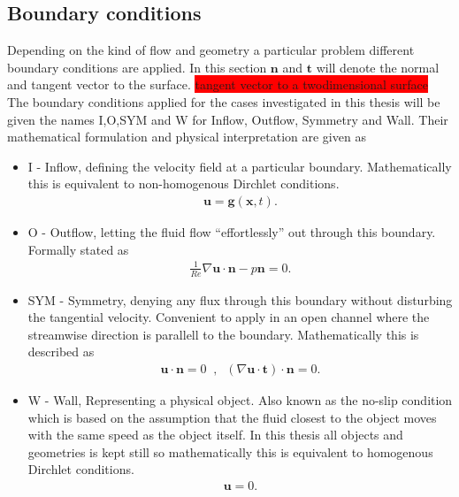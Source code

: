 \subsection{Boundary conditions}
Depending on the kind of flow and geometry a particular problem different boundary conditions are applied. In this section 
$\mathbf{n}$ and $\mathbf{t}$ will denote the normal and tangent vector to the surface.
\colorbox{red}{tangent vector to a twodimensional surface}
The boundary conditions applied for the cases investigated in this thesis will be given the names 
I,O,SYM and W for Inflow, Outflow, Symmetry and Wall. Their mathematical formulation and physical interpretation are given as 
\begin{itemize}
    \item I 
        - Inflow, defining the velocity field at a particular boundary. Mathematically this is equivalent to 
        non-homogenous Dirchlet conditions. 
        \begin{align}
            \mathbf{u} = \mathbf{g}(\mathbf{x},t).
        \end{align}
    \item O 
        - Outflow, letting the fluid flow ``effortlessly'' out through this boundary. Formally stated as
        \begin{align}
            \frac{1}{Re} \nabla\mathbf{u}\cdot \mathbf{n}-p\mathbf{n}= 0.
        \end{align}
    \item SYM 
        - Symmetry, denying any flux through this boundary without disturbing the tangential velocity. Convenient
        to apply in an open channel where the streamwise direction is parallell to the boundary. Mathematically this is 
        described as 
        \begin{align}
            \mathbf{u}\cdot \mathbf{n} = 0 \; \; , \; \; (\nabla\mathbf{u}\cdot \mathbf{t})\cdot \mathbf{n} = 0.
        \end{align}
    \item W 
        - Wall, Representing a physical object. Also known as the no-slip condition which is based on the assumption 
        that the fluid closest to the object moves with the same speed as the object itself. In this thesis all objects and 
        geometries is kept still so mathematically this is equivalent to 
        homogenous Dirchlet conditions. 
        \begin{align}
            \mathbf{u} = 0.
        \end{align}

\end{itemize}
%
